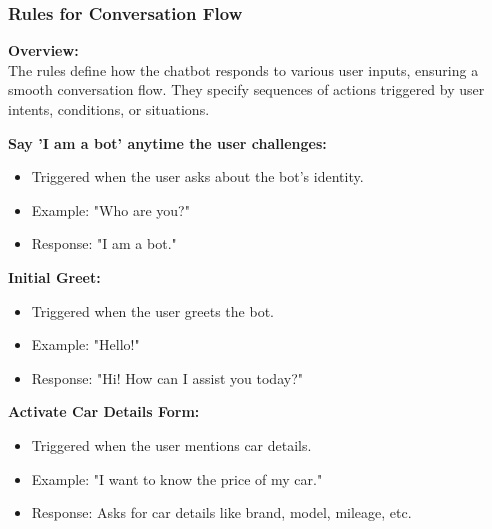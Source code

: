 \documentclass{beamer}
\begin{document}
\begin{frame}
	\frametitle{Rules for Conversation Flow}

	\textbf{Overview:} \\
	The rules define how the chatbot responds to various user inputs, ensuring a smooth conversation flow. They specify sequences of actions triggered by user intents, conditions, or situations. 
	
\textbf{Say 'I am a bot' anytime the user challenges:}
	\begin{itemize}
		\item Triggered when the user asks about the bot's identity.
		\item Example: "Who are you?"
		\item Response: "I am a bot."
	\end{itemize}
	
	\textbf{Initial Greet:}
	\begin{itemize}
		\item Triggered when the user greets the bot.
		\item Example: "Hello!"
		\item Response: "Hi! How can I assist you today?"
	\end{itemize}

	\textbf{Activate Car Details Form:}
	\begin{itemize}
		\item Triggered when the user mentions car details.
		\item Example: "I want to know the price of my car."
		\item Response: Asks for car details like brand, model, mileage, etc.
	\end{itemize}
\end{frame}
\end{document}
